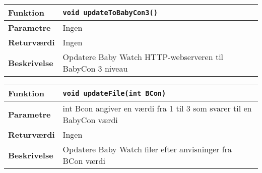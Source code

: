 \begin{center}
    \begin{tabular}{ | l | p{} |}
    \hline
    \textbf{Funktion}	& \verb+void updateToBabyCon3() +						\\ \hline
    \textbf{Parametre} 	& Ingen													\\ \hline
    \textbf{Returværdi}	& Ingen 												\\ \hline
    \textbf{Beskrivelse}	& Opdatere Baby Watch HTTP-webserveren til BabyCon 3 niveau\\ \hline
    \end{tabular}
\end{center}


\begin{center}
    \begin{tabular}{ | l | p{} |}
    \hline
    \textbf{Funktion}	& \verb+void updateFile(int BCon) +						\\ \hline
    \textbf{Parametre} 	& int Bcon angiver en værdi fra 1 til 3 som svarer til en BabyCon værdi													\\ \hline
    \textbf{Returværdi}	& Ingen 												\\ \hline
    \textbf{Beskrivelse}	& Opdatere Baby Watch filer efter anvisninger fra BCon værdi\\ \hline
    \end{tabular}
\end{center}
